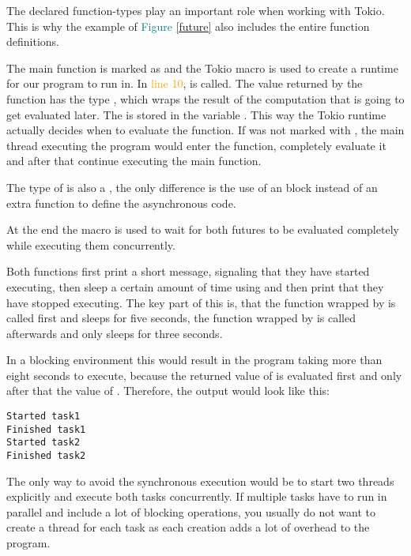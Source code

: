The declared function-types play an important role when working with Tokio. This is why the example of
\textcolor{teal}{Figure \ref{future}} also includes the entire function definitions.

The main function is marked as  and the Tokio macro is used to create a runtime for our program to run in.
In \textcolor{orange}{line 10},  is called. The value returned by the function has the type
, which wraps the result of the computation that is going to get evaluated later. The
 is stored in the variable . This way the Tokio runtime actually decides when to evaluate
the function. If  was not marked with , the main thread executing the program would
enter the function, completely evaluate it and after that continue executing the main function.

The type of  is also a , the only difference is the use of an  block instead of
an extra function to define the asynchronous code.

At the end the macro  is used to wait for both futures to be evaluated completely while executing
them concurrently.

Both functions first print a short message, signaling that they have started executing, then sleep a certain amount of
time using  and then print that they have stopped executing. The key part of this is, that the
function wrapped by  is called first and sleeps for five seconds, the function wrapped by 
is called afterwards and only sleeps for three seconds.

In a blocking environment this would result in the program taking more than eight seconds to execute, because the
returned value of  is evaluated first and only after that the value of . Therefore, the
output would look like this:

\begin{verbatim}
Started task1
Finished task1
Started task2
Finished task2
\end{verbatim}

The only way to avoid the synchronous execution would be to start two threads explicitly and execute both tasks
concurrently. If multiple tasks have to run in parallel and include a lot of blocking operations, you usually do not
want to create a thread for each task as each creation adds a lot of overhead to the program.

